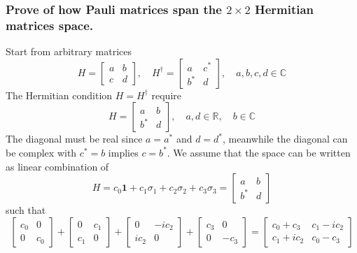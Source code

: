 \documentclass[../../../main.tex]{subfiles}
\begin{document}
\subsubsection{Prove of how Pauli matrices span the $2 \times 2$ Hermitian matrices space.}
Start from arbitrary matrices
\begin{equation*}
    H = \begin{bmatrix}
        a & b \\
        c & d
    \end{bmatrix},
    \quad
    H ^\dagger = \begin{bmatrix}
        a    & c ^* \\
        b ^* & d
    \end{bmatrix},
    \quad a, b, c, d \in \mathbb{C}
\end{equation*}
The Hermitian condition $H = H ^\dagger$ require
\begin{equation*}
    H = \begin{bmatrix}
        a   & b \\
        b^* & d
    \end{bmatrix}, \quad a, d \in \mathbb{R}, \quad b \in \mathbb{C}
\end{equation*}
The diagonal must be real since $a = a ^*$ and $d = d ^*$, meanwhile the diagonal can be complex with $c ^* = b$ implies $c  = b ^*$.
We assume that the space can be written as linear combination of
\begin{equation*}
    H =c_0 \mathbf{1 } + c_1 \sigma_1 + c_2 \sigma_2 + c_3 \sigma_3 =\begin{bmatrix}
        a   & b \\
        b^* & d
    \end{bmatrix}
\end{equation*}
such that
\begin{equation*}
    \begin{bmatrix}
        c_0 & 0   \\
        0   & c_0
    \end{bmatrix}
    +
    \begin{bmatrix}
        0   & c_1 \\
        c_1 & 0
    \end{bmatrix}
    +
    \begin{bmatrix}
        0    & -ic_2 \\
        ic_2 & 0
    \end{bmatrix}
    +
    \begin{bmatrix}
        c_3 & 0    \\
        0   & -c_3
    \end{bmatrix}
    =
    \begin{bmatrix}
        c_0 + c_3  & c_1 - ic_2 \\
        c_1 + ic_2 & c_0 - c_3
    \end{bmatrix}
\end{equation*}
\end{document}
